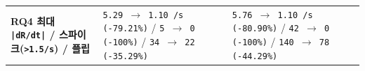 \documentclass[10.5pt,a4paper]{article}
\begin{document}
\begin{footnotesize}
\begin{longtable}{>{\raggedright\arraybackslash}p{} >{\raggedright\arraybackslash}p{} >{\raggedright\arraybackslash}p{}}
\textbf{RQ4 최대 \texttt{|dR/\allowbreak{}dt|} / 스파이크(\texttt{>1.\allowbreak{}5/\allowbreak{}s}) / 플립} & \texttt{5.\allowbreak{}29 $\rightarrow$ 1.\allowbreak{}10 /\allowbreak{}s (-\allowbreak{}79.\allowbreak{}21\%)} / \texttt{5 $\rightarrow$ 0 (-\allowbreak{}100\%)} / \texttt{34 $\rightarrow$ 22 (-\allowbreak{}35.\allowbreak{}29\%)} & \texttt{5.\allowbreak{}76 $\rightarrow$ 1.\allowbreak{}10 /\allowbreak{}s (-\allowbreak{}80.\allowbreak{}90\%)} / \texttt{42 $\rightarrow$ 0 (-\allowbreak{}100\%)} / \texttt{140 $\rightarrow$ 78 (-\allowbreak{}44.\allowbreak{}29\%)} \\
\end{longtable}
\end{footnotesize}
\end{document}
